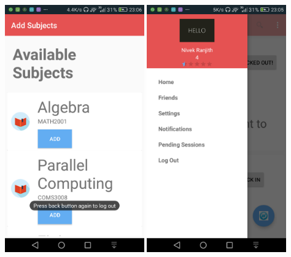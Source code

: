 \documentclass[12pt]{article}
\begin{document}
\begin{flushleft}
\includegraphics[width=60mm]{./Sprint3Models/Screenshots/availablesubjects.png}
\includegraphics[width=60mm]{./Sprint3Models/Screenshots/pulldown.png}
\end{flushleft}
\end{document}
